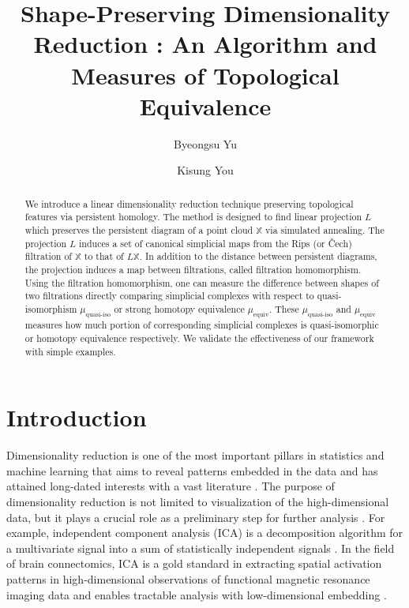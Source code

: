 \documentclass[11pt]{article}
\newcommand{\ptcloudx}{\mathbb{X}} %
\begin{document}
	
\title{Shape-Preserving Dimensionality Reduction : An Algorithm and Measures of Topological Equivalence}
\author[1]{Byeongsu Yu}
\author[2]{Kisung You}

\date{}

\maketitle
\begin{abstract}
We introduce a linear dimensionality reduction technique preserving topological features via persistent homology. The method is designed to find linear projection $L$ which preserves the persistent diagram of a point cloud $\ptcloudx$ via simulated annealing. The projection $L$ induces a set of canonical simplicial maps from the Rips (or \v{C}ech) filtration of $\ptcloudx$ to that of $L\ptcloudx$. In addition to the distance between persistent diagrams, the projection induces a map between filtrations, called filtration homomorphism. Using the filtration homomorphism, one can measure the difference between shapes of two filtrations directly comparing simplicial complexes with respect to quasi-isomorphism $\mu_{\operatorname{quasi-iso}}$ or  strong homotopy equivalence $\mu_{\operatorname{equiv}}$. These $\mu_{\operatorname{quasi-iso}}$ and $\mu_{\operatorname{equiv}}$ measures how much portion of corresponding simplicial complexes is quasi-isomorphic or homotopy equivalence respectively. We validate the effectiveness of our framework with simple examples.
\end{abstract}

\section{Introduction}\label{sec:intro}


Dimensionality reduction is one of the most important pillars in statistics and machine learning that aims to reveal patterns embedded in the data and has attained long-dated interests with a vast literature \citep{engel_survey_2012, ma_review_2013-2}. The purpose of dimensionality reduction is not limited to visualization of the high-dimensional data, but it plays a crucial role as a preliminary step for further analysis \citep{jolliffe_note_1982-1}. For example, independent component analysis (ICA) is a decomposition algorithm for a multivariate signal into a sum of statistically independent signals \citep{hyvarinen_independent_2001-1, hyvarinen_independent_2013}. In the field of brain connectomics, ICA is a gold standard in extracting spatial activation patterns in high-dimensional observations of functional magnetic resonance imaging data and enables tractable analysis with low-dimensional embedding  \citep{mckeown_independent_2003-1, park_structural_2013-2}. 
\end{document}
